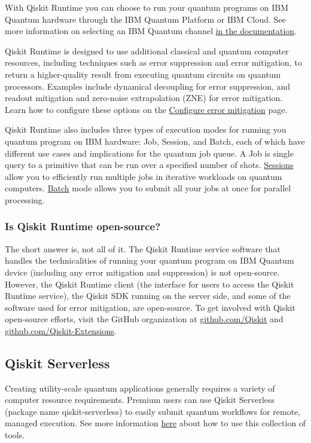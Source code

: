 With Qiskit Runtime you can choose to run your quantum programs on IBM Quantum hardware through the IBM Quantum Platform or IBM Cloud. See more information on selecting an IBM Quantum channel \href{https://docs.quantum.ibm.com/guides/setup-channel}{in the documentation}.

Qiskit Runtime is designed to use additional classical and quantum computer resources, including techniques such as error suppression and error mitigation, to return a higher-quality result from executing quantum circuits on quantum processors. Examples include dynamical decoupling for error suppression, and readout mitigation and zero-noise extrapolation (ZNE) for error mitigation. Learn how to configure these options on the \href{https://docs.quantum.ibm.com/guides/configure-error-mitigation}{Configure error mitigation} page.

Qiskit Runtime also includes three types of execution modes for running you quantum program on IBM hardware: Job, Session, and Batch, each of which have different use cases and implications for the quantum job queue. A Job is single query to a primitive that can be run over a specified number of shots. \href{https://docs.quantum.ibm.com/guides/sessions}{Sessions} allow you to efficiently run multiple jobs in iterative workloads on quantum computers. \href{https://docs.quantum.ibm.com/guides/run-jobs-batch}{Batch} mode allows you to submit all your jobs at once for parallel processing.

\subsubsection{Is Qiskit Runtime open-source?}
The short answer is, not all of it.  The Qiskit Runtime service software that handles the technicalities of running your quantum program on IBM Quantum device (including any error mitigation and suppression) is not open-source. However, the Qiskit Runtime client (the interface for users to access the Qiskit Runtime service), the Qiskit SDK running on the server side, and some of the software used for error mitigation, are open-source. To get involved with Qiskit open-source efforts, visit the GitHub organization at \href{https://github.com/Qiskit}{github.com/Qiskit} and \href{https://github.com/Qiskit-Extensions/}{github.com/Qiskit-Extensions}.

\subsection{Qiskit Serverless}
Creating utility-scale quantum applications generally requires a variety of computer resource requirements. Premium users can use Qiskit Serverless (package name qiskit-serverless) to easily submit quantum workflows for remote, managed execution. See more information \href{https://docs.quantum.ibm.com/guides/qiskit-serverless}{here} about how to use this collection of tools.


